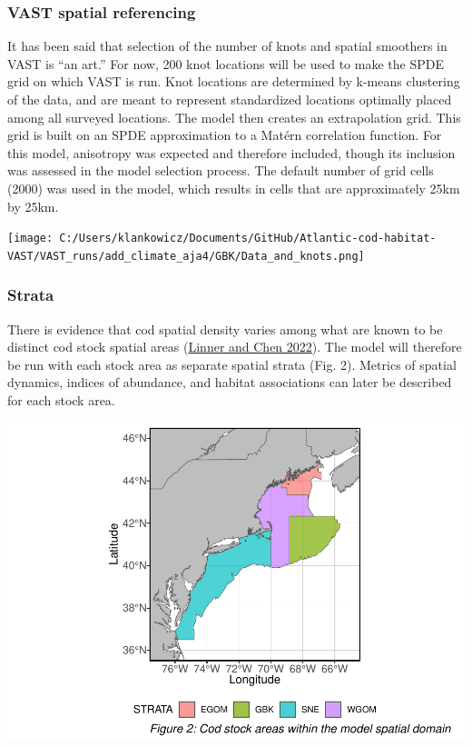 \documentclass[
]{article}
\let\origfigure\figure
\let\endorigfigure\endfigure
\renewenvironment{figure}[1][2] {
    \expandafter\origfigure\expandafter[H]
} {
    \endorigfigure
}
\begin{document}
\hypertarget{vast-spatial-referencing}{%
\subsubsection{VAST spatial referencing}\label{vast-spatial-referencing}}

It has been said that selection of the number of knots and spatial smoothers in VAST is ``an art.'' For now, 200 knot locations will be used to make the SPDE grid on which VAST is run. Knot locations are determined by k-means clustering of the data, and are meant to represent standardized locations optimally placed among all surveyed locations. The model then creates an extrapolation grid. This grid is built on an SPDE approximation to a Matérn correlation function. For this model, anisotropy was expected and therefore included, though its inclusion was assessed in the model selection process. The default number of grid cells (2000) was used in the model, which results in cells that are approximately 25km by 25km.

\begin{figure}
\centering
\texttt{[image: C:/Users/klankowicz/Documents/GitHub/Atlantic-cod-habitat-VAST/VAST\_runs/add\_climate\_aja4/GBK/Data\_and\_knots.png]}
\caption{Figure 1: Location of extrapolation points and knots within the model spatial domain}
\end{figure}

\hypertarget{strata}{%
\subsubsection{Strata}\label{strata}}

There is evidence that cod spatial density varies among what are known to be distinct cod stock spatial areas (\protect\hyperlink{ref-linner_2022}{Linner and Chen 2022}). The model will therefore be run with each stock area as separate spatial strata (Fig. 2). Metrics of spatial dynamics, indices of abundance, and habitat associations can later be described for each stock area.

\includegraphics{ToR1_TechPaper_files/figure-latex/spatial strata-1.pdf}
\end{document}
